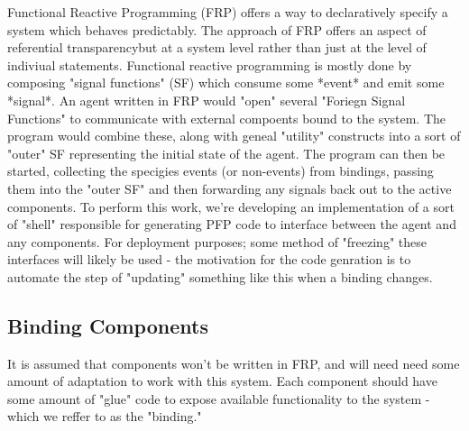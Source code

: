 Functional Reactive Programming (FRP) offers a way to declaratively specify a system which behaves predictably.\cite{perez2017testing}
    The approach of FRP offers an aspect of referential transparency\footnotemark but at a system level rather than just at the level of indiviual statements.
    Functional reactive programming is mostly done by composing "signal functions" (SF) which consume some *event* and emit some *signal*.\footnotemark
    An agent written in FRP would "open" several "Foriegn Signal Functions" to communicate with external compoents bound to the system.
    The program would combine these, along with geneal "utility" constructs into a sort of "outer" SF representing the initial state of the agent.
    The program can then be started, collecting the specigies events (or non-events) from bindings, passing them into the "outer SF" and then forwarding any signals back out to the active components.
To perform this work, we're developing an implementation of a sort of "shell" responsible for generating PFP code to interface between the agent and any components.
    For deployment purposes; some method of "freezing" these interfaces will likely be used - the motivation for the code genration is to automate the step of "updating" something like this when a binding changes.


\subsection{Binding Components}

It is assumed that components won't be written in FRP, and will need need some amount of adaptation to work with this system.
Each component should have some amount of "glue" code to expose available functionality to the system - which we reffer to as the "binding."

